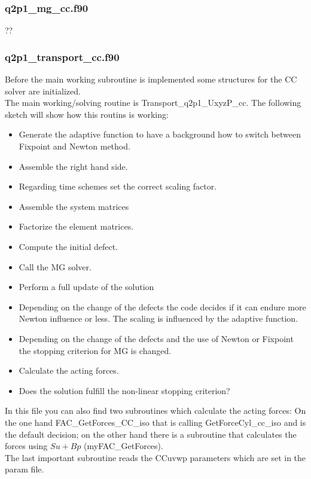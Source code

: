 \subsubsection*{q2p1\_mg\_cc.f90} 
??

\subsubsection*{q2p1\_transport\_cc.f90} 
Before the main working subroutine is implemented some structures for the CC solver are initialized.\\
The main working/solving routine is Transport\_q2p1\_UxyzP\_cc. The following sketch will show how this routins is working:
\begin{itemize}
\item Generate the adaptive function to have a background how to switch between Fixpoint and Newton method.
\item Assemble the right hand side.
\item Regarding time schemes set the correct scaling factor.
\item Assemble the system matrices
\item Factorize the element matrices.
\item Compute the initial defect.
\item Call the MG solver.
\item Perform a full update of the solution
\item Depending on the change of the defects the code decides if it can endure more Newton influence or less. The scaling is influenced by the adaptive function.
\item Depending on the change of the defects and the use of Newton or Fixpoint the stopping criterion for MG is changed.
\item Calculate the acting forces.
\item Does the solution fulfill the non-linear stopping criterion?
\end{itemize}
In this file you can also find two subroutines which calculate the acting forces: On the one hand FAC\_GetForces\_CC\_iso that is calling GetForceCyl\_cc\_iso and is the default decision; on the other hand there is a subroutine that calculates the forces using $S u + Bp$ (myFAC\_GetForces).\\
The last important subroutine reads the CCuvwp parameters which are set in the param file.

